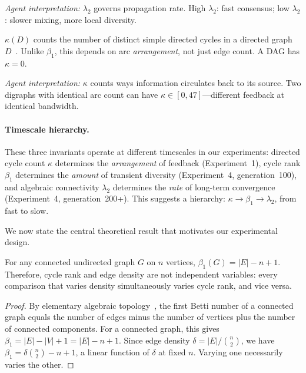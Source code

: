 \documentclass[runningheads]{llncs}
\begin{document}
\noindent
\textit{Agent interpretation:} $\lambda_2$ governs propagation rate.
High $\lambda_2$: fast consensus; low $\lambda_2$: slower mixing,
more local diversity.

\begin{definition}
\label{def:kappa}
$\kappa(D)$ counts the number of distinct simple directed cycles in a
directed graph $D$~\cite{johnson1975finding}. Unlike $\beta_1$, this
depends on arc \emph{arrangement}, not just edge count. A DAG has
$\kappa = 0$.
\end{definition}

\noindent
\textit{Agent interpretation:} $\kappa$ counts ways information
circulates back to its source. Two digraphs with identical arc count
can have $\kappa \in [0, 47]$---different feedback at identical bandwidth.

\paragraph{Timescale hierarchy.}
\label{rem:hierarchy}
These three invariants operate at different timescales in our
experiments: directed cycle count $\kappa$ determines the
\emph{arrangement} of feedback (Experiment~1), cycle rank $\beta_1$
determines the \emph{amount} of transient diversity
(Experiment~4, generation~100), and algebraic connectivity
$\lambda_2$ determines the \emph{rate} of long-term convergence
(Experiment~4, generation~200+). This suggests a hierarchy:
$\kappa \to \beta_1 \to \lambda_2$, from fast to slow.

We now state the central theoretical result that motivates our
experimental design.

\begin{thm}
\label{thm:confound}
For any connected undirected graph $G$ on $n$ vertices,
$\beta_1(G) = |E| - n + 1$. Therefore, cycle rank and edge density
are not independent variables: every comparison that varies density
simultaneously varies cycle rank, and vice versa.
\end{thm}

\begin{proof}
By elementary algebraic topology~\cite{hatcher2002algebraic}, the
first Betti number of a connected graph equals the number of edges
minus the number of vertices plus the number of connected components.
For a connected graph, this gives $\beta_1 = |E| - |V| + 1 = |E| - n + 1$.
Since edge density $\delta = |E| / \binom{n}{2}$, we have
$\beta_1 = \delta \binom{n}{2} - n + 1$, a linear function of
$\delta$ at fixed $n$. Varying one necessarily varies the other.
\end{proof}
\end{document}
